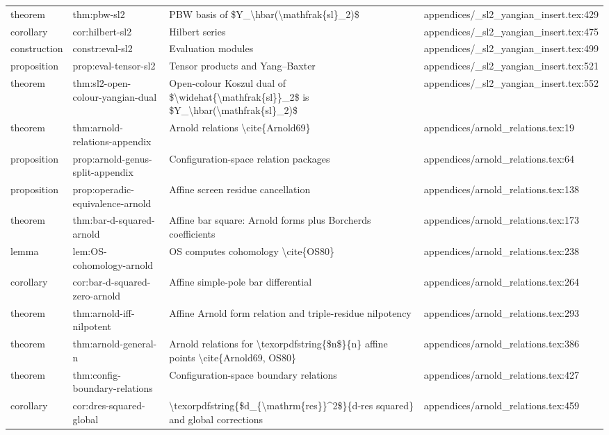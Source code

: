 \documentclass[11pt]{article}
\begin{document}
\begin{longtable}{L{0.10\textwidth}L{0.26\textwidth}L{0.42\textwidth}L{0.22\textwidth}}
theorem & thm:pbw-sl2 & PBW basis of \$Y\_\textbackslash{}hbar(\textbackslash{}mathfrak\{sl\}\_2)\$ & appendices/\_sl2\_yangian\_insert.tex:429\\
corollary & cor:hilbert-sl2 & Hilbert series & appendices/\_sl2\_yangian\_insert.tex:475\\
construction & constr:eval-sl2 & Evaluation modules & appendices/\_sl2\_yangian\_insert.tex:499\\
proposition & prop:eval-tensor-sl2 & Tensor products and Yang--Baxter & appendices/\_sl2\_yangian\_insert.tex:521\\
theorem & thm:sl2-op{}en-colour-yangian-dual & Op{}en-colour Koszul dual of \$\textbackslash{}widehat\{\textbackslash{}mathfrak\{sl\}\}\_2\$ is \$Y\_\textbackslash{}hbar(\textbackslash{}mathfrak\{sl\}\_2)\$ & appendices/\_sl2\_yangian\_insert.tex:552\\
theorem & thm:arnold-relations-appendix & Arnold relations \textbackslash{}cite\{Arnold69\} & appendices/arnold\_relations.tex:19\\
proposition & prop:arnold-genus-split-appendix & Configuration-space relation packages & appendices/arnold\_relations.tex:64\\
proposition & prop:operadic-equivalence-arnold & Affine screen residue cancellation & appendices/arnold\_relations.tex:138\\
theorem & thm:bar-d-squared-arnold & Affine bar square: Arnold forms plus Borcherds coefficients & appendices/arnold\_relations.tex:173\\
lemma & lem:OS-cohomology-arnold & OS computes cohomology \textbackslash{}cite\{OS80\} & appendices/arnold\_relations.tex:238\\
corollary & cor:bar-d-squared-zero-arnold & Affine simple-pole bar differential & appendices/arnold\_relations.tex:264\\
theorem & thm:arnold-iff-nilpotent & Affine Arnold form relation and triple-residue nilpotency & appendices/arnold\_relations.tex:293\\
theorem & thm:arnold-general-n & Arnold relations for \textbackslash{}texorpdfstring\{\$n\$\}\{n\} affine points \textbackslash{}cite\{Arnold69, OS80\} & appendices/arnold\_relations.tex:386\\
theorem & thm:config-boundary-relations & Configuration-space boundary relations & appendices/arnold\_relations.tex:427\\
corollary & cor:dres-squared-global & \textbackslash{}texorpdfstring\{\$d\_\{\textbackslash{}mathrm\{res\}\}\textasciicircum{}2\$\}\{d-res squared\} and global corrections & appendices/arnold\_relations.tex:459\\

\end{longtable}
\end{document}
